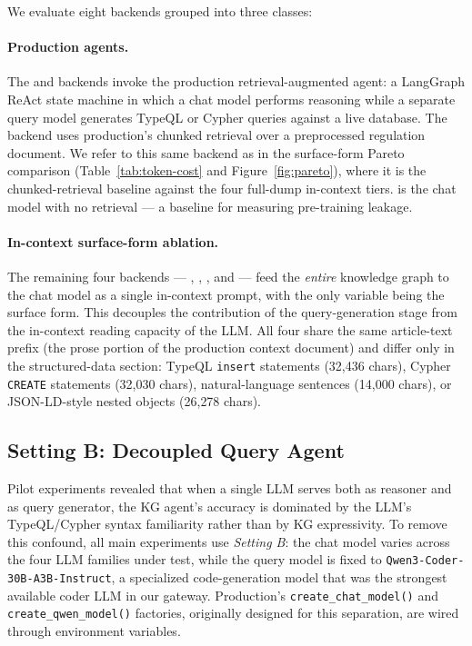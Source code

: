 We evaluate eight backends grouped into three classes:

\paragraph{Production agents.} The  and
 backends invoke the production retrieval-augmented
agent: a LangGraph ReAct state machine in which a chat model performs
reasoning while a separate query model generates TypeQL or Cypher
queries against a live database. The  backend
uses production's chunked retrieval over a preprocessed regulation
document. We refer to this same backend as  in the
surface-form Pareto comparison (Table~\ref{tab:token-cost} and
Figure~\ref{fig:pareto}), where it is the chunked-retrieval baseline
against the four full-dump in-context tiers. 
is the chat model with no retrieval — a baseline for measuring
pre-training leakage.

\paragraph{In-context surface-form ablation.} The remaining four
backends — , ,
, and  — feed the \emph{entire}
knowledge graph to the chat model as a single in-context prompt, with
the only variable being the surface form. This decouples the
contribution of the query-generation stage from the in-context
reading capacity of the LLM. All four share the same article-text
prefix (the prose portion of the production context document) and
differ only in the structured-data section: TypeQL \texttt{insert}
statements (32{,}436 chars), Cypher \texttt{CREATE} statements
(32{,}030 chars), natural-language sentences (14{,}000 chars), or
JSON-LD-style nested objects (26{,}278 chars).

\subsection{Setting B: Decoupled Query Agent}

Pilot experiments revealed that when a single LLM serves both as
reasoner and as query generator, the KG agent's accuracy is dominated
by the LLM's TypeQL/Cypher syntax familiarity rather than by KG
expressivity. To remove this confound, all main experiments use
\emph{Setting B}: the chat model varies across the four LLM families
under test, while the query model is fixed to
\texttt{Qwen3-Coder-30B-A3B-Instruct}, a specialized code-generation
model that was the strongest available coder LLM in our gateway.
Production's \texttt{create\_chat\_model()} and
\texttt{create\_qwen\_model()} factories, originally designed for this
separation, are wired through environment variables.

